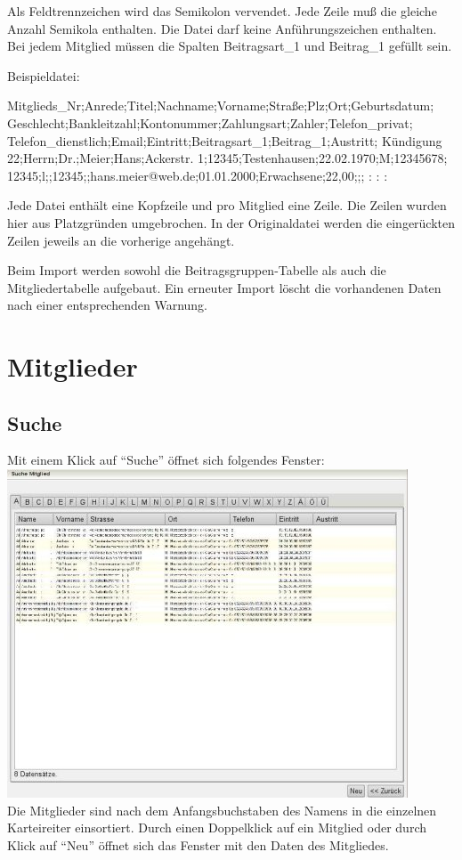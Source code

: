 \documentclass[a4paper,BCOR30mm,DIV14,pdftex,liststotoc,footsepline,openany]{scrbook}
\begin{document}
Als Feldtrennzeichen wird das Semikolon vervendet. Jede Zeile muß die gleiche Anzahl Semikola enthalten. 
Die Datei darf keine Anführungszeichen enthalten. Bei jedem Mitglied müssen die Spalten Beitragsart\_1 und Beitrag\_1 gefüllt sein.

Beispieldatei:\\
\begin{verbatim*}
Mitglieds_Nr;Anrede;Titel;Nachname;Vorname;Straße;Plz;Ort;Geburtsdatum;
    Geschlecht;Bankleitzahl;Kontonummer;Zahlungsart;Zahler;Telefon_privat;
    Telefon_dienstlich;Email;Eintritt;Beitragsart_1;Beitrag_1;Austritt;
    Kündigung
22;Herrn;Dr.;Meier;Hans;Ackerstr. 1;12345;Testenhausen;22.02.1970;M;12345678;
    12345;l;;12345;;hans.meier@web.de;01.01.2000;Erwachsene;22,00;;;
:
:
:
\end{verbatim*} 
Jede Datei enthält eine Kopfzeile und pro Mitglied eine Zeile. Die Zeilen wurden hier aus Platzgründen umgebrochen. In der Originaldatei werden die eingerückten Zeilen jeweils an die vorherige angehängt.

Beim Import werden sowohl die Beitragsgruppen-Tabelle als auch die Mitgliedertabelle aufgebaut. Ein erneuter Import löscht die vorhandenen Daten nach einer entsprechenden Warnung.



\chapter{Mitglieder}
\section{Suche}
Mit einem Klick auf ``Suche'' öffnet sich folgendes Fenster:\\
\includegraphics{./screenshots/mitgliedsuchen.jpg}\\
Die Mitglieder sind nach dem Anfangsbuchstaben des Namens in die einzelnen Karteireiter einsortiert. Durch einen Doppelklick auf ein Mitglied oder durch Klick auf ``Neu'' öffnet sich das Fenster mit den Daten des Mitgliedes.
\end{document}
